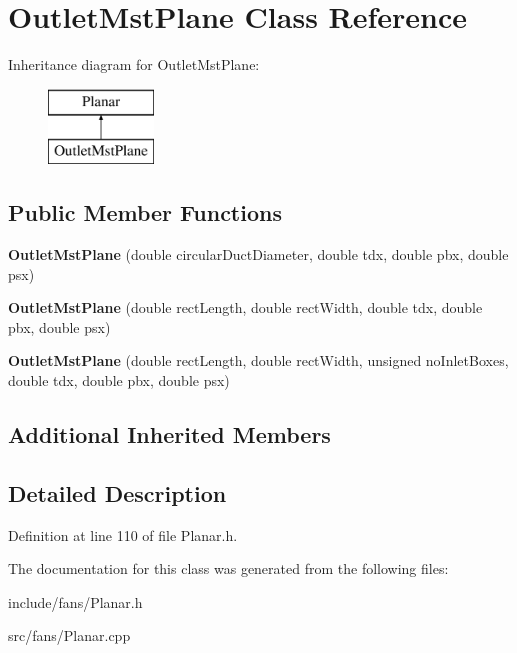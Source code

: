 \hypertarget{class_outlet_mst_plane}{}\section{Outlet\+Mst\+Plane Class Reference}
\label{class_outlet_mst_plane}
Inheritance diagram for Outlet\+Mst\+Plane\+:\begin{figure}[H]
\begin{center}
\leavevmode
\includegraphics[height=2.000000cm]{d6/de6/class_outlet_mst_plane}
\end{center}
\end{figure}
\subsection*{Public Member Functions}
\begin{DoxyCompactItemize}
\item 
\mbox{\label{class_outlet_mst_plane_a83a020ae8e9e225955ff409b0b9e53f6}} 
{\bfseries Outlet\+Mst\+Plane} (double circular\+Duct\+Diameter, double tdx, double pbx, double psx)
\item 
\mbox{\label{class_outlet_mst_plane_a3c33c96e5fa63c708143e8ad4237ec06}} 
{\bfseries Outlet\+Mst\+Plane} (double rect\+Length, double rect\+Width, double tdx, double pbx, double psx)
\item 
\mbox{\label{class_outlet_mst_plane_a75a25cfdd51a9150285178fd8d70929c}} 
{\bfseries Outlet\+Mst\+Plane} (double rect\+Length, double rect\+Width, unsigned no\+Inlet\+Boxes, double tdx, double pbx, double psx)
\end{DoxyCompactItemize}
\subsection*{Additional Inherited Members}


\subsection{Detailed Description}


Definition at line 110 of file Planar.\+h.



The documentation for this class was generated from the following files\+:\begin{DoxyCompactItemize}
\item 
include/fans/Planar.\+h\item 
src/fans/Planar.\+cpp\end{DoxyCompactItemize}
